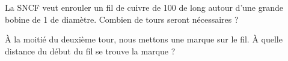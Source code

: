 
\begin{exercice}\label{exosmath-0464}

    La SNCF veut enrouler un fil de cuivre de \unit{100}{\meter} de long autour d'une grande bobine de \unit{1}{\meter} de diamètre. Combien de tours seront nécessaires ?

    À la moitié du deuxième tour, nous mettons une marque sur le fil. À quelle distance du début du fil se trouve la marque ?

\end{exercice}
